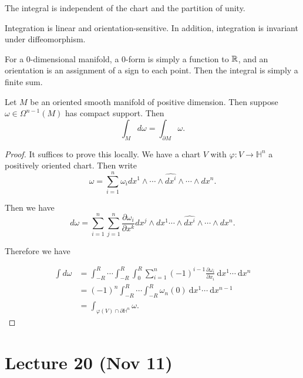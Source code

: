 \documentclass[twoside, 10pt]{article}
\renewcommand{\d}{\ \mathrm{d}}
\renewcommand{\H}{\mathbb{H}}
\begin{document}
    \begin{lem}
        The integral is independent of the chart and the partition of unity.
    \end{lem}

    \begin{prop}
        Integration is linear and orientation-sensitive. In addition, integration is invariant under diffeomorphism.
    \end{prop}

    For a $0$-dimensional manifold, a $0$-form is simply a function to $\mathbb{R}$, and an orientation is an assignment of a sign to each point. Then the integral is simply a finite sum.

    \begin{thm}[Stokes]
        Let $M$ be an oriented smooth manifold of positive dimension. Then suppose $\omega \in \Omega^{n-1}(M)$ has compact support. Then
        \[ \int_M d\omega = \int_{\partial M} \omega.\]
    \end{thm}

    \begin{proof}
        It suffices to prove this locally. We have a chart $V$ with $\varphi:V \to \H^n$ a positively oriented chart. Then write \[\omega = \sum_{i=1}^n \omega_i dx^1 \wedge \cdots \wedge \widehat{dx^i} \wedge \cdots \wedge dx^n.\]

        Then we have 
        \[d\omega = \sum_{i=1}^n \sum_{j=1}^n \frac{\partial \omega_i}{\partial x^k} dx^j \wedge dx^1 \cdots \wedge \widehat{dx^i} \wedge \cdots \wedge dx^n.\]

        Therefore we have 

        \begin{align*}
            \int d \omega &= \int_{-R}^R \cdots \int_{-R}^R \int_0^R \sum_{i=1}^n (-1)^{i-1} \frac{\partial \omega_i}{\partial x_i} \d x^1 \cdots \d x^n \\
                          &= (-1)^n \int_{-R}^R \cdots \int_{-R}^R \omega_n(0) \d x^1 \cdots \d x^{n-1} \\
                          &= \int_{\varphi(V) \cap \partial \H^n} \omega.
        \end{align*}
    \end{proof}

    \section{Lecture 20 (Nov 11)}%
    \label{sec:lecture_20_nov_11_}
\end{document}
